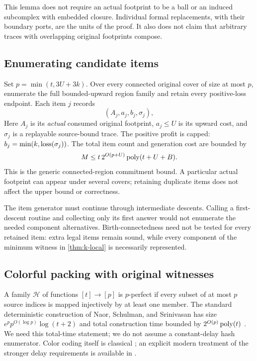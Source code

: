 This lemma does not require an actual footprint to be a ball or an induced
subcomplex with embedded closure. Individual formal replacements, with their
boundary ports, are the units of the proof. It also does not claim that
arbitrary traces with overlapping original footprints compose.

\subsection{Enumerating candidate items}

Set $p=\min(t,3U+3k)$. Over every connected original cover of size at most
$p$, enumerate the full bounded-upward region family and retain every
positive-loss endpoint. Each item $j$ records
\[
 (A_j,a_j,b_j,\sigma_j),
\]
Here $A_j$ is its \emph{actual} consumed original footprint, $a_j\le U$
is its upward cost, and $\sigma_j$ is a replayable source-bound trace.
The positive profit is capped: $b_j=\min(k,\operatorname{loss}(\sigma_j))$. The total item
count and generation cost are bounded by
\begin{equation}\label{eq:items}
 M\le t\,2^{O(p+U)}\operatorname{poly}(t+U+B).
\end{equation}
This is the generic connected-region commitment bound. A particular actual
footprint can appear under several covers; retaining duplicate items does
not affect the upper bound or correctness.

The item generator must continue through intermediate descents. Calling a
first-descent routine and collecting only its first answer would not enumerate
the needed component alternatives. Birth-connectedness need not be tested
for every retained item: extra legal items remain sound, while every component
of the minimum witness in \cref{thm:k-local} is necessarily represented.

\subsection{Colorful packing with original witnesses}

A family $\mathcal H$ of functions $[t]\to[p]$ is $p$-perfect if every subset
of at most $p$ source indices is mapped injectively by at least one member.
The standard deterministic construction of Naor, Schulman, and Srinivasan
has size $e^p p^{O(\log p)}\log(t+2)$ and total construction time bounded by
$2^{O(p)}\operatorname{poly}(t)$ \cite{nss}. We need this total-time statement; we do not
assume a constant-delay hash enumerator. Color coding itself is classical
\cite{color-coding}; an explicit modern treatment of the stronger delay
requirements is available in \cite{gutin-color}.

